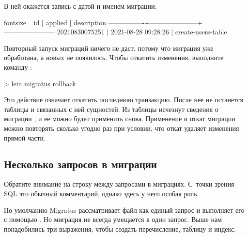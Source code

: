 В ней окажется запись с датой и именем миграции:


\begin{english}
  \begin{text*}{fontsize=\small}
         id     |       applied       |      description
----------------+---------------------+-----------------------
 20210830075251 | 2021-08-28 09:28:26 | create-users-table
  \end{text*}
\end{english}

Повторный запуск миграций ничего не даст, потому что миграция  уже обработана, а новых не появилось. Чтобы откатить изменения, выполните команду :

\begin{english}
  \begin{clojure}
> lein migratus rollback
  \end{clojure}
\end{english}

Это действие означает откатить последнюю транзакцию. После нее не останется таблицы  и связанных с ней сущностей. Из таблицы  исчезнут сведения о миграции , и ее можно будет применить снова. Применение и откат миграции можно повторять сколько угодно раз при условии, что откат удаляет изменения прямой части.

\subsection{Несколько запросов в миграции}

Обратите внимание на строку \code{--;;} между запросами в миграциях. С~точки зрения SQL это обычный комментарий, однако здесь у него особая роль.

По умолчанию Migratus рассматривает файл как единый запрос и выполняет его с помощью . Но миграция не всегда умещается в один запрос.
Выше нам понадобились три выражения, чтобы создать перечисление, таблицу и индекс.

